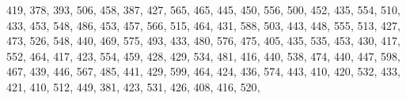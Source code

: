 \documentclass[
]{book}
\newenvironment{Shaded}{\begin{snugshade}}{\end{snugshade}}
\newcommand{\DecValTok}[1]{\textcolor[rgb]{0.00,0.00,0.81}{#1}}
\newcommand{\NormalTok}[1]{#1}
\begin{document}
\begin{Shaded}
\begin{Highlighting}[]
          \DecValTok{419}\NormalTok{, }\DecValTok{378}\NormalTok{, }\DecValTok{393}\NormalTok{, }\DecValTok{506}\NormalTok{, }\DecValTok{458}\NormalTok{, }\DecValTok{387}\NormalTok{, }\DecValTok{427}\NormalTok{, }\DecValTok{565}\NormalTok{, }\DecValTok{465}\NormalTok{, }\DecValTok{445}\NormalTok{, }\DecValTok{450}\NormalTok{, }\DecValTok{556}\NormalTok{, }\DecValTok{500}\NormalTok{, }\DecValTok{452}\NormalTok{, }\DecValTok{435}\NormalTok{, }\DecValTok{554}\NormalTok{, }
          \DecValTok{510}\NormalTok{, }\DecValTok{433}\NormalTok{, }\DecValTok{453}\NormalTok{, }\DecValTok{548}\NormalTok{, }\DecValTok{486}\NormalTok{, }\DecValTok{453}\NormalTok{, }\DecValTok{457}\NormalTok{, }\DecValTok{566}\NormalTok{, }\DecValTok{515}\NormalTok{, }\DecValTok{464}\NormalTok{, }\DecValTok{431}\NormalTok{, }\DecValTok{588}\NormalTok{, }\DecValTok{503}\NormalTok{, }\DecValTok{443}\NormalTok{, }\DecValTok{448}\NormalTok{, }\DecValTok{555}\NormalTok{, }
          \DecValTok{513}\NormalTok{, }\DecValTok{427}\NormalTok{, }\DecValTok{473}\NormalTok{, }\DecValTok{526}\NormalTok{, }\DecValTok{548}\NormalTok{, }\DecValTok{440}\NormalTok{, }\DecValTok{469}\NormalTok{, }\DecValTok{575}\NormalTok{, }\DecValTok{493}\NormalTok{, }\DecValTok{433}\NormalTok{, }\DecValTok{480}\NormalTok{, }\DecValTok{576}\NormalTok{, }\DecValTok{475}\NormalTok{, }\DecValTok{405}\NormalTok{, }\DecValTok{435}\NormalTok{, }\DecValTok{535}\NormalTok{, }
          \DecValTok{453}\NormalTok{, }\DecValTok{430}\NormalTok{, }\DecValTok{417}\NormalTok{, }\DecValTok{552}\NormalTok{, }\DecValTok{464}\NormalTok{, }\DecValTok{417}\NormalTok{, }\DecValTok{423}\NormalTok{, }\DecValTok{554}\NormalTok{, }\DecValTok{459}\NormalTok{, }\DecValTok{428}\NormalTok{, }\DecValTok{429}\NormalTok{, }\DecValTok{534}\NormalTok{, }\DecValTok{481}\NormalTok{, }\DecValTok{416}\NormalTok{, }\DecValTok{440}\NormalTok{, }\DecValTok{538}\NormalTok{, }
          \DecValTok{474}\NormalTok{, }\DecValTok{440}\NormalTok{, }\DecValTok{447}\NormalTok{, }\DecValTok{598}\NormalTok{, }\DecValTok{467}\NormalTok{, }\DecValTok{439}\NormalTok{, }\DecValTok{446}\NormalTok{, }\DecValTok{567}\NormalTok{, }\DecValTok{485}\NormalTok{, }\DecValTok{441}\NormalTok{, }\DecValTok{429}\NormalTok{, }\DecValTok{599}\NormalTok{, }\DecValTok{464}\NormalTok{, }\DecValTok{424}\NormalTok{, }\DecValTok{436}\NormalTok{, }\DecValTok{574}\NormalTok{, }
          \DecValTok{443}\NormalTok{, }\DecValTok{410}\NormalTok{, }\DecValTok{420}\NormalTok{, }\DecValTok{532}\NormalTok{, }\DecValTok{433}\NormalTok{, }\DecValTok{421}\NormalTok{, }\DecValTok{410}\NormalTok{, }\DecValTok{512}\NormalTok{, }\DecValTok{449}\NormalTok{, }\DecValTok{381}\NormalTok{, }\DecValTok{423}\NormalTok{, }\DecValTok{531}\NormalTok{, }\DecValTok{426}\NormalTok{, }\DecValTok{408}\NormalTok{, }\DecValTok{416}\NormalTok{, }\DecValTok{520}\NormalTok{, }

\end{Highlighting}
\end{Shaded}
\end{document}

